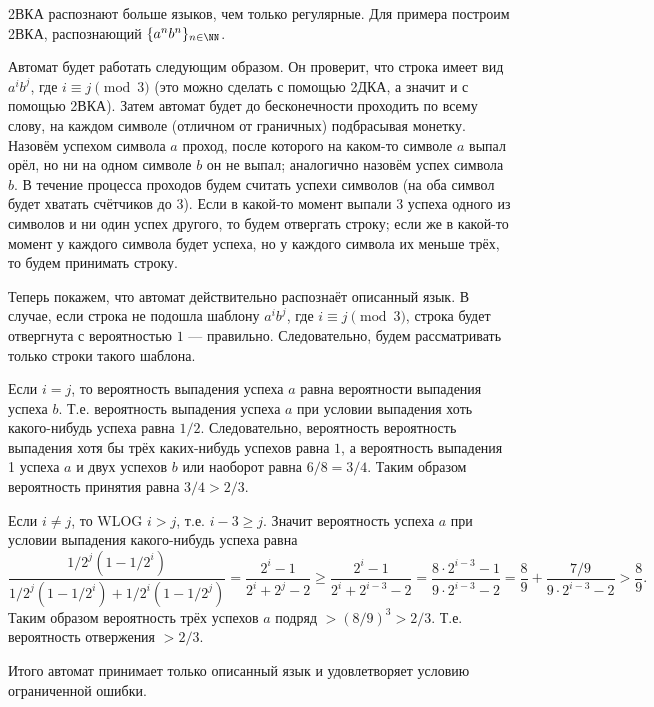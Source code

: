 \documentclass[12pt,a4paper]{article}
\begin{document}
    \begin{example}
        2ВКА распознают больше языков, чем только регулярные. Для примера построим 2ВКА, распознающий $\{a^n b^n\}_{n \in \NN}$.

        Автомат будет работать следующим образом. Он проверит, что строка имеет вид $a^i b^j$, где $i \equiv j \pmod{3}$ (это можно сделать с помощью 2ДКА, а значит и с помощью 2ВКА). Затем автомат будет до бесконечности проходить по всему слову, на каждом символе (отличном от граничных) подбрасывая монетку. Назовём успехом символа $a$ проход, после которого на каком-то символе $a$ выпал орёл, но ни на одном символе $b$ он не выпал; аналогично назовём успех символа $b$. В течение процесса проходов будем считать успехи символов (на оба символ будет хватать счётчиков до 3). Если в какой-то момент выпали 3 успеха одного из символов и ни один успех другого, то будем отвергать строку; если же в какой-то момент у каждого символа будет успеха, но у каждого символа их меньше трёх, то будем принимать строку.

        Теперь покажем, что автомат действительно распознаёт описанный язык. В случае, если строка не подошла шаблону $a^i b^j$, где $i \equiv j \pmod{3}$, строка будет отвергнута с вероятностью $1$ --- правильно. Следовательно, будем рассматривать только строки такого шаблона.
        
        Если $i = j$, то вероятность выпадения успеха $a$ равна вероятности выпадения успеха $b$. Т.е. вероятность выпадения успеха $a$ при условии выпадения хоть какого-нибудь успеха равна $1/2$. Следовательно, вероятность вероятность выпадения хотя бы трёх каких-нибудь успехов равна $1$, а вероятность выпадения 1 успеха $a$ и двух успехов $b$ или наоборот равна $6/8 = 3/4$. Таким образом вероятность принятия равна $3/4 > 2/3$.

        Если $i \neq j$, то WLOG $i > j$, т.е. $i - 3 \geqslant j$. Значит вероятность успеха $a$ при условии выпадения какого-нибудь успеха равна
        \[
            \frac{1/2^j (1 - 1/2^i)}{1/2^j (1 - 1/2^i) + 1/2^i (1 - 1/2^j)}
            = \frac{2^i - 1}{2^i + 2^j - 2}
            \geqslant \frac{2^i - 1}{2^i + 2^{i-3} - 2}
            = \frac{8 \cdot 2^{i-3} - 1}{9 \cdot 2^{i-3} - 2}
            = \frac{8}{9} + \frac{7/9}{9 \cdot 2^{i-3} - 2}
            > \frac{8}{9}.
        \]
        Таким образом вероятность трёх успехов $a$ подряд $>(8/9)^3 > 2/3$. Т.е. вероятность отвержения $>2/3$.

        Итого автомат принимает только описанный язык и удовлетворяет условию ограниченной ошибки.
    \end{example}
\end{document}
